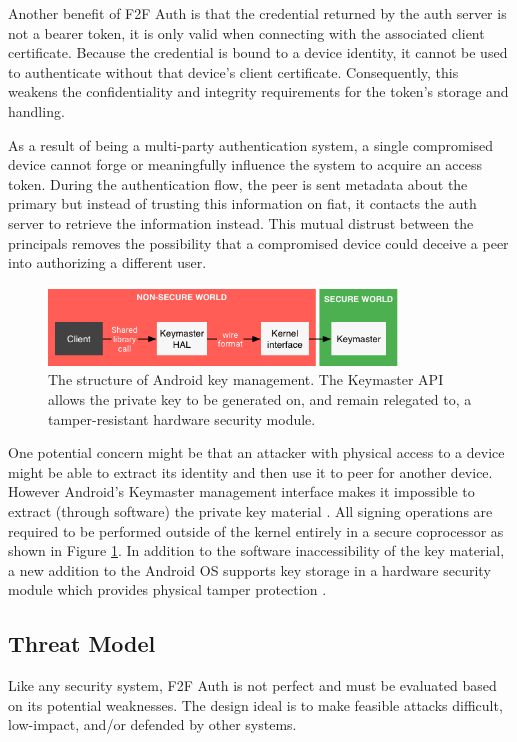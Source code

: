 \documentclass[letterpaper, 10 pt, conference]{ieeeconf}
\begin{document}
  Another benefit of F2F Auth is that the credential returned by the auth server is not a bearer token, it is only valid when connecting with the associated client certificate.
  Because the credential is bound to a device identity, it cannot be used to authenticate without that device's client certificate.
  Consequently, this weakens the confidentiality and integrity requirements for the token's storage and handling.

  As a result of being a multi-party authentication system, a single compromised device cannot forge or meaningfully influence the system to acquire an access token.
  During the authentication flow, the peer is sent metadata about the primary but instead of trusting this information on fiat, it contacts the auth server to retrieve the information instead.
  This mutual distrust between the principals removes the possibility that a compromised device could deceive a peer into authorizing a different user.

  \begin{figure}
    \centering
    \includegraphics[width=350px]{access-to-keymaster.png}
    \caption{The structure of Android key management. The Keymaster API allows the private key to be generated on, and remain relegated to, a tamper-resistant hardware security module.}
    \label{keymaster}
  \end{figure}

  One potential concern might be that an attacker with physical access to a device might be able to extract its identity and then use it to peer for another device.
  However Android's Keymaster management interface makes it impossible to extract (through software) the private key material \cite{androidkeys}.
  All signing operations are required to be performed outside of the kernel entirely in a secure coprocessor as shown in Figure \ref{keymaster}.
  In addition to the software inaccessibility of the key material, a new addition to the Android OS supports key storage in a hardware security module which provides physical tamper protection \cite{androidstrongbox}.

\subsection{Threat Model} \label{secattacks}
  Like any security system, F2F Auth is not perfect and must be evaluated based on its potential weaknesses.
  The design ideal is to make feasible attacks difficult, low-impact, and/or defended by other systems.
\end{document}
